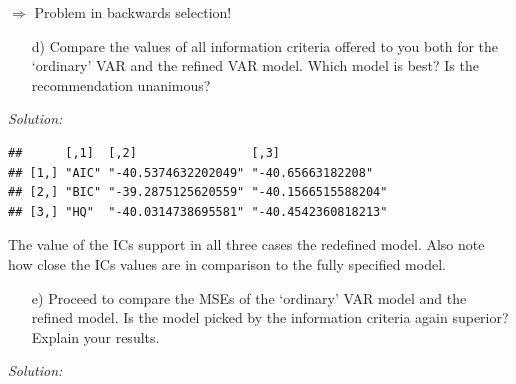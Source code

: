 \documentclass[12pt,a4paper]{article}
\newenvironment{Shaded}{\begin{snugshade}}{\end{snugshade}}
\newcommand{\CommentTok}[1]{\textcolor[rgb]{0.56,0.35,0.01}{\textit{#1}}}
\newcommand{\FloatTok}[1]{\textcolor[rgb]{0.00,0.00,0.81}{#1}}
\newcommand{\KeywordTok}[1]{\textcolor[rgb]{0.13,0.29,0.53}{\textbf{#1}}}
\newcommand{\NormalTok}[1]{#1}
\newcommand{\OperatorTok}[1]{\textcolor[rgb]{0.81,0.36,0.00}{\textbf{#1}}}
\newcommand{\StringTok}[1]{\textcolor[rgb]{0.31,0.60,0.02}{#1}}
\begin{document}
\(\Rightarrow\) Problem in backwards selection!

\begin{itemize}
  \item[d)]  Compare the values of all information criteria offered to you both for the ‘ordinary’ VAR and the refined VAR model. Which model is best? Is the recommendation unanimous?
\end{itemize}

\emph{Solution:}

\begin{Shaded}
\end{Shaded}

\begin{verbatim}
##      [,1]  [,2]                [,3]               
## [1,] "AIC" "-40.5374632202049" "-40.65663182208"  
## [2,] "BIC" "-39.2875125620559" "-40.1566515588204"
## [3,] "HQ"  "-40.0314738695581" "-40.4542360818213"
\end{verbatim}

The value of the ICs support in all three cases the redefined model.
Also note how close the ICs values are in comparison to the fully
specified model.

\begin{itemize}
  \item[e)] Proceed to compare the MSEs of the ‘ordinary’ VAR model and the refined model. Is the model picked by the information criteria again superior? Explain your results.
\end{itemize}

\emph{Solution:}

\begin{Shaded}
\end{Shaded}
\end{document}

